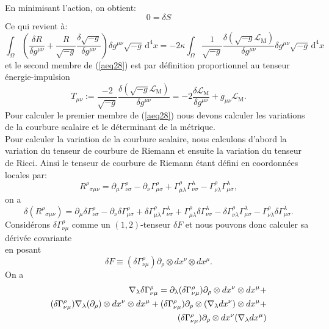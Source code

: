 \documentclass[a4paper,12pt]{report}
\theoremstyle{plain}
\theoremstyle{plain}
\begin{document}
En minimisant l'action, on obtient: 
 $$ 0  = \delta S $$ 
 Ce qui revient \`a:
\begin{equation}
   \int_{\Omega} \left(\frac{\delta R}{\delta g^{\mu\nu}} + \frac{R}{\sqrt{-g}} 
\frac{\delta \sqrt{-g}}{\delta g^{\mu\nu}}\right)\delta g^{\mu\nu} \sqrt{-g}\,  \mathrm{d}^4x = - 2 \kappa \int_{\Omega}
\frac{1}{\sqrt{-g}}\frac{\delta (\sqrt{-g} 
\mathcal{L}_\mathrm{M})}{\delta g^{\mu\nu}}\delta g^{\mu\nu} \sqrt{-g}\,  \mathrm{d}^4x \ \label{aeq28}
\end{equation}
et le second membre de (\ref{aeq28}) est par d\'efinition proportionnel au tenseur \'energie-impulsion
\begin{equation}
   T_{\mu\nu}:= \frac{-2}{\sqrt{-g}}\frac{\delta (\sqrt{-g} 
\mathcal{L}_\mathrm{M})}{\delta g^{\mu\nu}} = -2 \frac{\delta 
\mathcal{L}_\mathrm{M}}{\delta g^{\mu\nu}} + g_{\mu\nu} 
\mathcal{L}_\mathrm{M}.  \label{aeq29}
\end{equation}
Pour calculer le premier membre de (\ref{aeq28}) nous devons calculer les variations de la courbure scalaire et le d\'eterminant
de la m\'etrique.  \\
Pour calculer la variation de la courbure scalaire,  nous calculons d'abord la variation du tenseur de courbure de Riemann et
ensuite la variation 
du tenseur de Ricci.   Ainsi le tenseur de courbure de Riemann \'etant d\'efini en coordonn\'ees locales par:
\begin{equation}
   {R^\rho}_{\sigma\mu\nu} = \partial_\mu\Gamma^\rho_{\nu\sigma} - 
\partial_\nu\Gamma^\rho_{\mu\sigma} + 
\Gamma^\rho_{\mu\lambda}\Gamma^\lambda_{\nu\sigma} - 
\Gamma^\rho_{\nu\lambda}\Gamma^\lambda_{\mu\sigma}\label{aeq30}, 
\end{equation}
 on a 
\begin{equation}\label{a310}
   \delta ({R^\rho}_{\sigma\mu\nu}) = \partial_\mu \delta \Gamma^\rho_{\nu\sigma} - 
\partial_{\nu} \delta \Gamma^\rho_{\mu\sigma} + 
\delta \Gamma^\rho_{\mu\lambda}\Gamma^\lambda_{\nu\sigma} + \Gamma^\rho_{\mu\lambda}\delta \Gamma^\lambda_{\nu\sigma}-
\delta \Gamma^\rho_{\nu\lambda}\Gamma^\lambda_{\mu\sigma} - \Gamma^\rho_{\nu\lambda} \delta \Gamma^\lambda_{\mu\sigma}.     
\end{equation}
Consid\'erons $ \delta\Gamma^\rho_{\nu\mu}$ comme un $(1, 2)$-tenseur $\delta F$ et nous pouvons donc calculer sa d\'eriv\'ee covariante\\
en posant
$$   \delta F \equiv (\delta\Gamma^\rho_{\nu\mu}) \partial_{\rho}\otimes dx^{\nu}\otimes dx^{\mu}.     $$
On a
\begin{eqnarray*}
 \nabla_{\lambda}  \delta\Gamma^\rho_{\nu\mu}=\partial_{\lambda}( \delta\Gamma^\rho_{\nu\mu})\partial_{\rho}\otimes dx^{\nu}\otimes dx^{\mu} + \cr
(\delta\Gamma^\rho_{\nu\mu})\nabla_{\lambda}(\partial_{\rho})\otimes dx^{\nu}\otimes dx^{\mu}  +(\delta\Gamma^\rho_{\nu\mu}) \partial_{\rho}\otimes (\nabla_{\lambda}dx^{\nu})\otimes dx^{\mu} +\cr
(\delta\Gamma^\rho_{\nu\mu}) \partial_{\rho}\otimes dx^{\nu} (\nabla_{\lambda}dx^{\mu}) \\ 
\end{eqnarray*}
\end{document}
